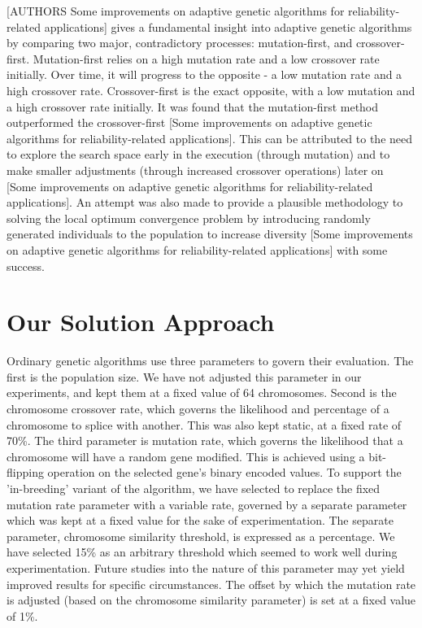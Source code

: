\documentclass{sig-alternate}
\begin{document}
[AUTHORS Some improvements on adaptive genetic algorithms for reliability-related applications] gives a fundamental insight into adaptive genetic algorithms by comparing two major, contradictory processes: mutation-first, and crossover-first. Mutation-first relies on a high mutation rate and a low crossover rate initially. Over time, it will progress to the opposite - a low mutation rate and a high crossover rate. Crossover-first is the exact opposite, with a low mutation and a high crossover rate initially. It was found that the mutation-first method outperformed the crossover-first [Some improvements on adaptive genetic algorithms for reliability-related applications]. This can be attributed to the need to explore the search space early in the execution (through mutation) and to make smaller adjustments (through increased crossover operations) later on [Some improvements on adaptive genetic algorithms for reliability-related applications]. An attempt was also made to provide a plausible methodology to solving the local optimum convergence problem by introducing randomly generated individuals to the population to increase diversity [Some improvements on adaptive genetic algorithms for reliability-related applications] with some success.

% 
%
\section{Our Solution Approach}\label{params}
Ordinary genetic algorithms use three parameters to govern their evaluation. The first is the population size. We have not adjusted this parameter in our experiments, and kept them at a fixed value of 64 chromosomes. Second is the chromosome crossover rate, which governs the likelihood and percentage of a chromosome to splice with another. This was also kept static, at a fixed rate of 70\%. The third parameter is mutation rate, which governs the likelihood that a chromosome will have a random gene modified. This is achieved using a bit-flipping operation on the selected gene's binary encoded values. To support the 'in-breeding' variant of the algorithm, we have selected to replace the fixed mutation rate parameter with a variable rate, governed by a separate parameter which was kept at a fixed value for the sake of experimentation. The separate parameter, chromosome similarity threshold, is expressed as a percentage. We have selected 15\% as an arbitrary threshold which seemed to work well during experimentation. Future studies into the nature of this parameter may yet yield improved results for specific circumstances. The offset by which the mutation rate is adjusted (based on the chromosome similarity parameter) is set at a fixed value of 1\%.
\end{document}
